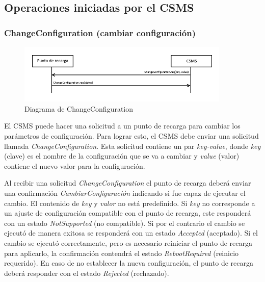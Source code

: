\documentclass[12pt,a4paper,onecolumn,oneside]{report}
\begin{document}
\subsection{Operaciones iniciadas por el CSMS}
\label{Operaciones iniciadas por el CSMS}


\subsubsection{ChangeConfiguration (cambiar configuración)}
\label{ChangeConfiguration (cambiar configuración)}


\begin{figure}[h] 
\centering
  \includegraphics[width=0.9\textwidth]{figuras/diagramachangeconfiguration.png}
  \caption[Diagrama de \textit{ChangeConfiguration}]{Diagrama de ChangeConfiguration\\
  }
  \label{fig:diagramachangeconfiguration}
\end{figure}

El CSMS puede hacer una solicitud a un punto de recarga para cambiar los parámetros de configuración. Para lograr esto, el CSMS debe enviar una solicitud llamada \textit{ChangeConfiguration}. Esta solicitud contiene un par \textit{key-value}, donde \textit{key} (clave) es el nombre de la configuración que se va a cambiar y \textit{value} (valor) contiene el nuevo valor para la configuración.

Al recibir una solicitud \textit{ChangeConfiguration} el punto de recarga deberá enviar una confirmación \textit{CambiarConfiguración} indicando si fue capaz de ejecutar el cambio. El contenido de \textit{key} y \textit{valor} no está predefinido. Si \textit{key} no corresponde a un ajuste de configuración compatible con el punto de recarga, este responderá con un estado \textit{NotSupported} (no compatible). Si por el contrario el cambio se ejecutó de manera exitosa se responderá con un estado \textit{Accepted} (aceptado). Si el cambio se ejecutó correctamente, pero es necesario reiniciar el punto de recarga para aplicarlo, la confirmación contendrá el estado \textit{RebootRequired} (reinicio requerido). En caso de no establecer la nueva configuración, el punto de recarga deberá responder con el estado \textit{Rejected} (rechazado).
\end{document}
